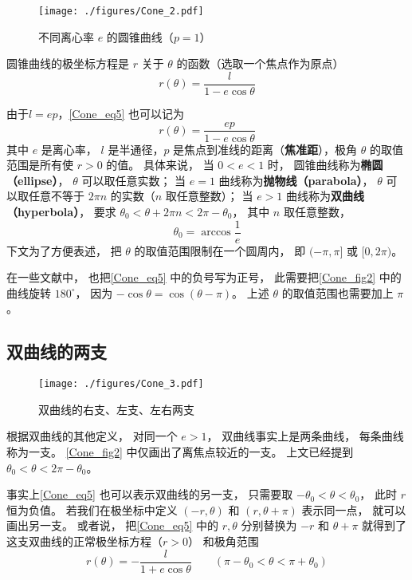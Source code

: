 

\begin{figure}[ht]
\centering
\texttt{[image: ./figures/Cone\_2.pdf]}
\caption{不同离心率 $e$ 的圆锥曲线（$p = 1$）} \label{Cone_fig2}
\end{figure}

圆锥曲线的极坐标方程是 $r$ 关于 $\theta$ 的函数（选取一个焦点作为原点）
\begin{equation}\label{Cone_eq5}
r(\theta)  = \frac{l}{1 - e\cos \theta }
\end{equation}

由于$l=ep$，\autoref{Cone_eq5} 也可以记为
\begin{equation}\label{Cone_eq3}
r(\theta) = \frac{ep}{1 - e\cos \theta }
\end{equation}
其中 $e$ 是离心率， $l$ 是半通径，$p$ 是焦点到准线的距离（\textbf{焦准距}），极角 $\theta$ 的取值范围是所有使 $r>0$ 的值。 具体来说， 当 $0 < e < 1$ 时， 圆锥曲线称为\textbf{椭圆（ellipse）}， $\theta$ 可以取任意实数； 当 $e = 1$ 曲线称为\textbf{抛物线（parabola）}， $\theta$ 可以取任意不等于 $2\pi n$ 的实数（$n$ 取任意整数）； 当 $e > 1$ 曲线称为\textbf{双曲线（hyperbola）}， 要求 $\theta_0< \theta + 2\pi n < 2\pi-\theta_0$， 其中 $n$ 取任意整数，
\begin{equation}
\theta_0 = \arccos\frac{1}{e}
\end{equation}
下文为了方便表述， 把 $\theta$ 的取值范围限制在一个圆周内， 即 $(-\pi,\pi]$ 或 $[0, 2\pi)$。

在一些文献中， 也把\autoref{Cone_eq5} 中的负号写为正号， 此需要把\autoref{Cone_fig2} 中的曲线旋转 $180^\circ$， 因为 $-\cos\theta = \cos(\theta - \pi)$。 上述 $\theta$ 的取值范围也需要加上 $\pi$。

\subsection{双曲线的两支}
\begin{figure}[ht]
\centering
\texttt{[image: ./figures/Cone\_3.pdf]}
\caption{双曲线的右支、左支、左右两支} \label{Cone_fig3}
\end{figure}
根据双曲线的其他定义， 对同一个 $e>1$， 双曲线事实上是两条曲线， 每条曲线称为一支。 \autoref{Cone_fig2} 中仅画出了离焦点较近的一支。 上文已经提到 $\theta_0< \theta < 2\pi-\theta_0$。

事实上\autoref{Cone_eq5} 也可以表示双曲线的另一支， 只需要取 $-\theta_0< \theta < \theta_0$， 此时 $r$ 恒为负值。 若我们在极坐标中定义 $(-r, \theta)$ 和 $(r, \theta + \pi)$ 表示同一点， 就可以画出另一支。 或者说， 把\autoref{Cone_eq5} 中的  $r,\theta$ 分别替换为 $-r$ 和 $\theta+\pi$ 就得到了这支双曲线的正常极坐标方程（$r > 0$） 和极角范围
\begin{equation}\label{Cone_eq6}
r(\theta) = -\frac{l}{1 + e\cos\theta} \qquad (\pi - \theta_0<\theta < \pi + \theta_0)
\end{equation}

